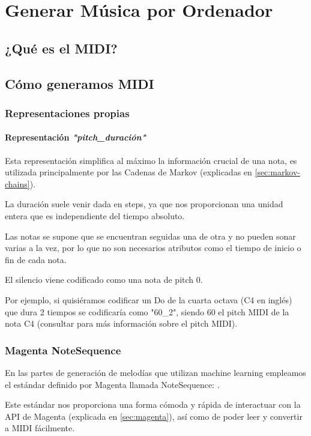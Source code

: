 \chapter{Generar Música por Ordenador}
\label{cap:generacionMusical}

\section{¿Qué es el MIDI?}

\section{Cómo generamos MIDI}
    \subsection{Representaciones propias}
        \subsubsection{Representación \textit{"pitch\_duración"}}
        \label{subsub:representacion-pitch_duracion}
        Esta representación simplifica al máximo la información crucial de una nota, es utilizada principalmente por las Cadenas de Markov (explicadas en \ref{sec:markov-chains}).

        La duración suele venir dada en steps, ya que nos proporcionan una unidad entera que es independiente del tiempo absoluto.

        Las notas se supone que se encuentran seguidas una de otra y no pueden sonar varias a la vez, por lo que no son necesarios atributos como el tiempo de inicio o fin de cada nota.

        El silencio viene codificado como una nota de pitch 0.

        Por ejemplo, si quisiéramos codificar un Do de la cuarta octava (C4 en inglés) que dura 2 tiempos se codificaría como "60\_2", siendo 60 el pitch MIDI de la nota C4 (consultar \cite{MIDIPitch} para más información sobre el pitch MIDI).

    \subsection{Magenta NoteSequence}
    En las partes de generación de melodías que utilizan machine learning empleamos el estándar definido por Magenta llamada NoteSequence: \cite{note-seq}. 

    Este estándar nos proporciona una forma cómoda y rápida de interactuar con la API de Magenta (explicada en \ref{sec:magenta}), así como de poder leer y convertir a MIDI fácilmente.

